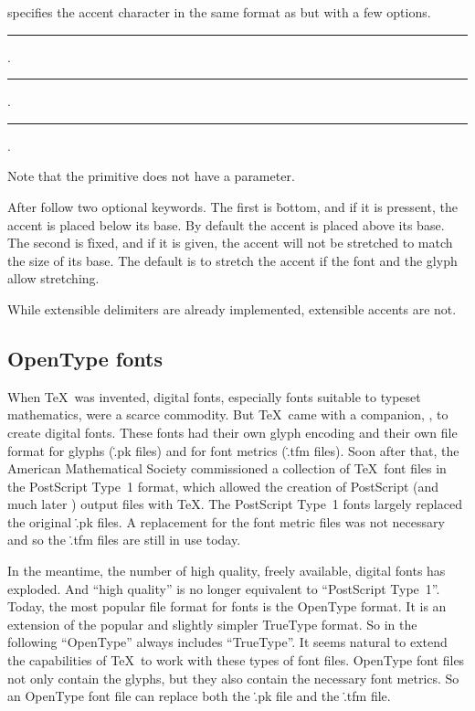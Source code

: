  specifies the accent character in the same format as 
but with a few options.

\medskip
\rule{}:    .
\rule{}:   .
\rule{}:    
      .
\medskip
\itemize
\item Note that the  primitive does not have a  parameter.
\item After  follow two optional keywords. The first is \.{bottom}, and
if it is pressent, the accent is placed below its base.
By default the accent is placed above its base.
The second is \.{fixed}, and if it is given, the accent will not be stretched to
match the size of its base.
The default is to stretch the accent if the font and the glyph allow stretching.
\item While extensible delimiters are already implemented, extensible accents are not.
\enditemize 


\subsection{OpenType fonts}
When \TeX\ was invented, digital fonts, especially fonts suitable to typeset
mathematics, were a scarce commodity. But \TeX\ came with a companion, \MF, to
create digital fonts. These fonts had their own glyph encoding
and their own file format for glyphs  (\.{.pk} files)
and for font metrics (\.{.tfm} files).
Soon after that, the American Mathematical Society commissioned
a collection of \TeX\ font files in the PostScript Type~1 format, which allowed
the creation of PostScript (and much later \PDF) output files with \TeX.
The PostScript Type~1 fonts largely replaced the original \.{.pk} files.
A replacement for the font metric files was not necessary and so the \.{.tfm} files
are still in use today.

In the meantime, the number of high quality, freely available, digital fonts has
exploded. And ``high quality'' is no longer equivalent to ``PostScript Type~1''.
Today, the most popular file format for fonts is the OpenType format. It is an extension
of the popular and slightly simpler TrueType format. So in the following ``OpenType''
always includes ``TrueType''.
It seems natural to extend the
capabilities of \TeX\ to work with these types of font files.
OpenType font files not only contain the glyphs, but they also contain the
necessary font metrics. So an OpenType font file can replace both the \.{.pk} file
and the \.{.tfm} file.

